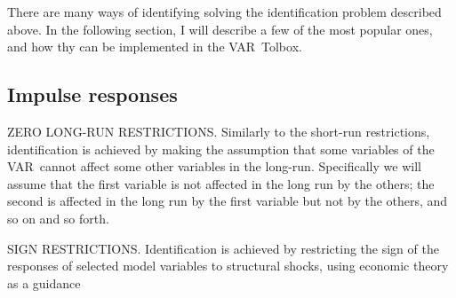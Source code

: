 \documentclass[10pt]{article}
\begin{document}
There are many ways of identifying solving the identification problem
described above. In the following section, I will describe a few of the most
popular ones, and how thy can be implemented in the VAR\ Tolbox.

\subsection{Impulse responses}

ZERO LONG-RUN RESTRICTIONS. Similarly to the short-run restrictions,
identification is achieved by making the assumption that some variables of
the VAR\ cannot affect some other variables in the long-run. Specifically we
will assume that the first variable is not affected in the long run by the
others; the second is affected in the long run by the first variable but not
by the others, and so on and so forth.

SIGN RESTRICTIONS. Identification is achieved by restricting the sign of the
responses of selected model variables to structural shocks, using economic
theory as a guidance
\end{document}
